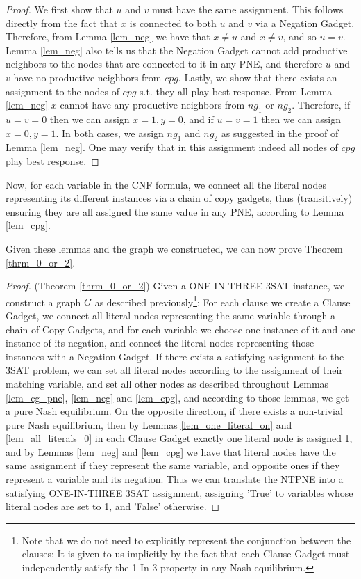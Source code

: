 \documentclass[runningheads]{llncs}
\begin{document}
\begin{proof}
We first show that $u$ and $v$ must have the same assignment. This follows directly from the fact that $x$ is connected to both $u$ and $v$ via a Negation Gadget. Therefore, from Lemma \ref{lem_neg} we have that $x\ne u$ and $x\ne v$, and so $u=v$. 
Lemma \ref{lem_neg} also tells us that the Negation Gadget cannot add productive neighbors to the nodes that are connected to it in any PNE, and therefore $u$ and $v$ have no productive neighbors from $cpg$.
Lastly, we show that there exists an assignment to the nodes of $cpg$ s.t. they all play best response. From Lemma \ref{lem_neg} $x$ cannot have any productive neighbors from $ng_1$ or $ng_2$. Therefore, if $u=v=0$ then we can assign $x=1,y=0$, and if $u=v=1$ then we can assign $x=0,y=1$. In both cases, we assign $ng_1$ and $ng_2$ as suggested in the proof of Lemma \ref{lem_neg}. One may verify that in this assignment indeed all nodes of $cpg$ play best response.
\end{proof}

Now, for each variable in the CNF formula, we connect all the literal nodes representing its different instances via a chain of copy gadgets, thus (transitively) ensuring they are all assigned the same value in any PNE, according to Lemma \ref{lem_cpg}.

Given these lemmas and the graph we constructed, we can now prove Theorem \ref{thrm_0_or_2}.

\begin{proof}(Theorem \ref{thrm_0_or_2})
Given a ONE-IN-THREE 3SAT instance, we construct a graph $G$ as described previously\footnote{Note that we do not need to explicitly represent the conjunction between the clauses: It is given to us implicitly by the fact that each Clause Gadget must independently satisfy the 1-In-3 property in any Nash equilibrium.}: For each clause we create a Clause Gadget, we connect all literal nodes representing the same variable through a chain of Copy Gadgets, and for each variable we choose one instance of it and one instance of its negation, and connect the literal nodes representing those instances with a Negation Gadget. If there exists a satisfying assignment to the 3SAT problem, we can set all literal nodes according to the assignment of their matching variable, and set all other nodes as described throughout Lemmas \ref{lem_cg_pne}, \ref{lem_neg} and \ref{lem_cpg}, and according to those lemmas, we get a pure Nash equilibrium.
On the opposite direction, if there exists a non-trivial pure Nash equilibrium, then by Lemmas \ref{lem_one_literal_on} and \ref{lem_all_literals_0} in each Clause Gadget exactly one literal node is assigned 1, and by Lemmas \ref{lem_neg} and \ref{lem_cpg} we have that literal nodes have the same assignment if they represent the same variable, and opposite ones if they represent a variable and its negation. Thus we can translate the NTPNE into a satisfying ONE-IN-THREE 3SAT assignment, assigning 'True' to variables whose literal nodes are set to 1, and 'False' otherwise.
\end{proof}
\end{document}
